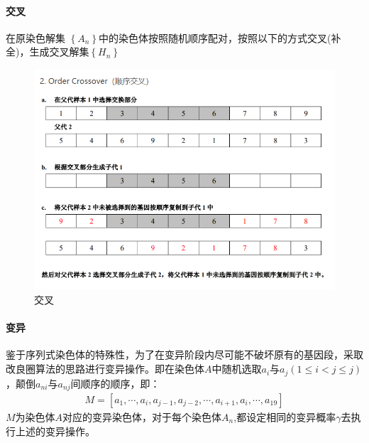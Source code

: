 \documentclass{whutmod}
\begin{document}
        \paragraph{交叉}
        在原染色解集 $\left \{ A_n \right \}$中的染色体按照随机顺序配对，按照以下的方式交叉(补全)，生成交叉解集$\left \{H_n\right \}$
         \begin{figure}[H]
        	\centering
        	\includegraphics[width=\textwidth]{figures/2121.png}
        	\caption{交叉}\label{lct}
        \end{figure}
         \paragraph{变异}
         鉴于序列式染色体的特殊性，为了在变异阶段内尽可能不破坏原有的基因段，采取改良圈算法的思路进行变异操作。即在染色体$A$中随机选取$a_{i}$与$a_{j}(1\leqslant i<j\leqslant j )$，颠倒$a_{ni}$与$a_{nj}$间顺序的顺序，即：
          \begin{gather}
          M=[a_{1},\cdots,a_{i},a_{j-1},a_{j-2},\cdots,a_{i+1},a_{i},\cdots,a_{19}]
          \end{gather}
          $M$为染色体$A$对应的变异染色体，对于每个染色体$A_n$,都设定相同的变异概率$\gamma$去执行上述的变异操作。 
\end{document}
